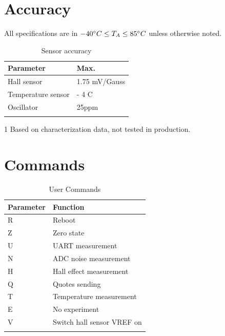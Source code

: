 \documentclass[10pt]{datasheet}
\begin{document}
\section{Accuracy}
All specifications are in $-40\degree C \leq T_A \leq 85\degree C$ unless otherwise noted.
\begin{table}[h]
\caption{Sensor accuracy}
\begin{tabularx}{\textwidth}{l | X}
    \thickhline
	\textbf{Parameter} & \textbf{Max.}  \hspace{5cm} \\
    \hline
	Hall sensor & 1.75 mV/Gauss \\
	Temperature sensor & \pm 3 - 4 \degree C \\
	Oscillator & \pm 25ppm \\
	
    \thickhline
\end{tabularx}
	\begin{tablenotes}
\item[1]{Based on characterization data, not tested in production.}
	\end{tablenotes}
\end{table}





\newpage

\section{Commands}
\begin{table}[h]
\caption{User Commands}
\begin{tabularx}{\textwidth}{l | X}
    \thickhline
    \textbf{Parameter} & \textbf{Function} \hspace{5cm} \\
    \hline
   	R & Reboot \\
	Z & Zero state \\
	U & UART measurement\\
	N & ADC noise measurement\\
	H & Hall effect measurement\\
	Q & Quotes sending\\
	T & Temperature measurement\\
	E & No experiment\\
	V & Switch hall sensor VREF on\\
    \thickhline
\end{tabularx}
\end{table}
\end{document}
